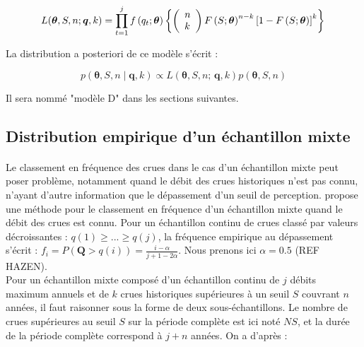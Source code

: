 \documentclass[11pt]{article}
\begin{document}
					\begin{equation}
			L(\boldsymbol{\theta}, S, n ; \boldsymbol{q}, k) = \prod_{t=1}^j f\left(q_t;\boldsymbol{\theta}\right) \left\{\left(\begin{array}{l}
			n \\
			k
			\end{array}\right) F\left(S;\boldsymbol{\theta}\right)^{n-k}\left[1-F\left(S;\boldsymbol{\theta}\right)\right]^k\right\} \\
			\label{eq:Gev_Binom_SN}
			\end{equation}
		
		La distribution a posteriori de ce modèle s'écrit :
					
			\begin{equation}
				p(\boldsymbol{\theta}, S, n \mid \boldsymbol{q},k) \propto L(\boldsymbol{\theta},S, n;\,\boldsymbol{q},k) p(\boldsymbol{\theta},S, n)
				\label{eq:Bayes_uSN}
			\end{equation}

	Il sera nommé "modèle D" dans les sections suivantes. 

	\subsection{Distribution empirique d'un échantillon mixte}
	
		\paragraph{} Le classement en fréquence des crues dans le cas d'un échantillon mixte peut poser problème, notamment quand le débit des crues historiques n'est pas connu, n'ayant d'autre information que le dépassement d'un seuil de perception. \citet{hirsch_probability_1987} propose une méthode pour le classement en fréquence d'un échantillon mixte quand le débit des crues est connu. Pour un échantillon continu de crues classé par valeurs décroissantes : $q(1) \geq ... \geq q(j)$, la fréquence empirique au dépassement s'écrit : $f_i = P(\boldsymbol{Q} > q(i)) = \frac{i-\alpha}{j+1-2\alpha}$. Nous prenons ici $\alpha = 0.5$ (REF HAZEN). \\
		Pour un échantillon mixte composé d'un échantillon continu de $j$ débits maximum annuels et de $k$ crues historiques supérieures à un seuil $S$ couvrant $n$ années, il faut raisonner sous la forme de deux sous-échantillons. Le nombre de crues supérieures au seuil $S$ sur la période complète est ici noté $NS$, et la durée de la période complète correspond à $j + n$ années. On a d'après \citet{hirsch_probability_1987} :
		
\end{document}
